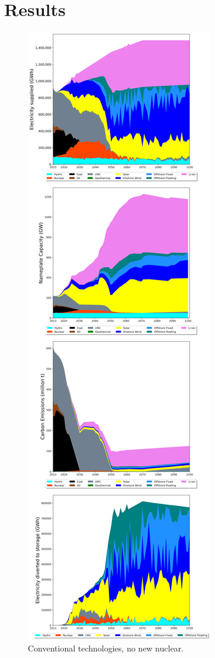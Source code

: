 \section{Results} \label{Results-and-discussion}

\begin{figure}[h] 
\centering
\label{scen1}
\includegraphics[scale=0.2]{figures/conv_nonuc}
\caption{Conventional technologies, no new nuclear.}
\end{figure}

